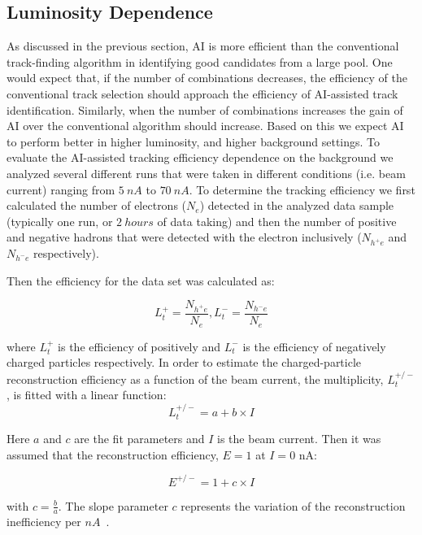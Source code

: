 \documentclass[aps,prl,preprint,12pt]{revtex4}
\begin{document}
\subsection{Luminosity Dependence}

As discussed in the previous section, AI is more efficient than the conventional track-finding 
algorithm in identifying good candidates from a large pool. One would expect that, if the number 
of combinations decreases, the efficiency of the conventional track selection should approach the 
efficiency of AI-assisted track identification. Similarly, when the number of combinations 
increases the gain of AI over the conventional algorithm should increase. Based on this we 
expect AI to perform better in higher luminosity, and higher background settings. To evaluate the 
AI-assisted tracking efficiency dependence on the background we analyzed several different runs 
that were taken in different conditions (i.e. beam current) ranging from $5~nA$ to $70~nA$. 
To determine the tracking efficiency we first calculated the number of electrons ($N_e$) detected 
in the analyzed data sample (typically one run, or $2~hours$ of data taking) and then the number of 
positive and negative hadrons that were detected with the electron inclusively ($N_{h^+e}$ and 
$N_{h^-e}$ respectively).

Then the efficiency for the data set was calculated as:

\begin{equation}
L_t^+ = \frac{N_{h^+e}}{N_e} , L_t^- = \frac{N_{h^-e}}{N_e} 
\end{equation}

where $L_t^+$ is the efficiency of positively and $L_t^-$ is the efficiency of negatively 
charged particles respectively. In order to estimate the charged-particle reconstruction efficiency 
as a function of the beam current, the multiplicity, $L_t^{+/-}$, is fitted with a linear function:
\begin{equation}
L_t^{+/-} = a + b\times I 
\end{equation}

Here $a$ and $c$ are the fit parameters and $I$ is the beam current. Then it was assumed that the 
reconstruction efficiency, $E=1$ at $I=0$ nA:

\begin{equation}
E^{+/-} = 1 + c \times I 
\end{equation}

with $c=\frac{b}{a}$. The slope parameter $c$ represents the variation of the reconstruction 
inefficiency per $nA$~\cite{Stepanyan:2020bg}.
 
\end{document}
